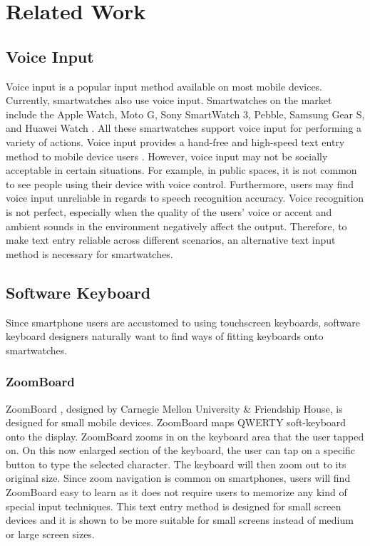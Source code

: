 \section{Related Work}

\subsection{Voice Input}
Voice input is a popular input method available on most mobile devices. Currently, smartwatches also use voice input. Smartwatches on the market include the Apple Watch, Moto G, Sony SmartWatch 3, Pebble, Samsung Gear S, and Huawei Watch \cite{huawei-watch}. All these smartwatches support voice input for performing a variety of actions. Voice input provides a hand-free and high-speed text entry method to mobile device users \cite{voice-input-mobile,android-speech-recognition}. However, voice input may not be socially acceptable in certain situations. For example, in public spaces, it is not common to see people using their device with voice control. Furthermore, users may find voice input unreliable in regards to speech recognition accuracy. Voice recognition is not perfect, especially when the quality of the users’ voice or accent and ambient sounds in the environment negatively affect the output. Therefore, to make text entry reliable across different scenarios, an alternative text input method is necessary for smartwatches.

\subsection{Software Keyboard}
Since smartphone users are accustomed to using touchscreen keyboards, software keyboard designers naturally want to find ways of fitting keyboards onto smartwatches.

\subsubsection{ZoomBoard}
ZoomBoard \cite{zoomboard}, designed by Carnegie Mellon University \& Friendship House, is designed for small mobile devices. ZoomBoard maps QWERTY soft-keyboard onto the display. ZoomBoard zooms in on the keyboard area that the user tapped on. On this now enlarged section of the keyboard, the user can tap on a specific button to type the selected character. The keyboard will then zoom out to its original size. Since zoom navigation is common on smartphones, users will find ZoomBoard easy to learn as it does not require users to memorize any kind of special input techniques. This text entry method is designed for small screen devices and it is shown to be more suitable for small screens instead of medium or large screen sizes.\cite{text-entry-on-small-qwerty}

